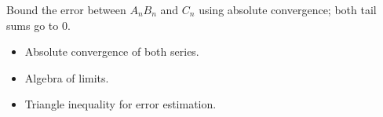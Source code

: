 \begin{remark*}
Bound the error between $A_n B_n$ and $C_n$ using absolute convergence; both tail sums go to 0.
\end{remark*}

\begin{remark*}[Dependencies]
\begin{itemize}
  \item Absolute convergence of both series.
  \item Algebra of limits.
  \item Triangle inequality for error estimation.
\end{itemize}
\end{remark*}
